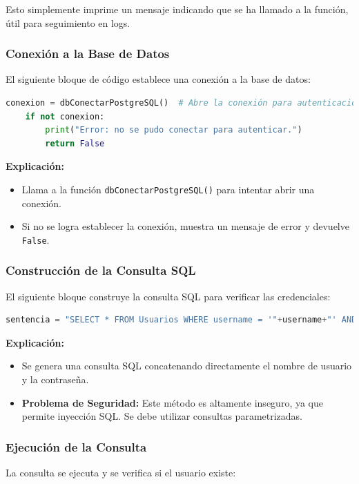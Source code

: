 \documentclass[a4paper,12pt]{article}
\begin{document}
Esto simplemente imprime un mensaje indicando que se ha llamado a la función, útil para seguimiento en logs.

\subsubsection{Conexión a la Base de Datos}
El siguiente bloque de código establece una conexión a la base de datos:

\begin{lstlisting}[language=Python]
    conexion = dbConectarPostgreSQL()  # Abre la conexión para autenticación
    if not conexion:
        print("Error: no se pudo conectar para autenticar.")
        return False
\end{lstlisting}

\textbf{Explicación:}
\begin{itemize}
    \item Llama a la función \texttt{dbConectarPostgreSQL()} para intentar abrir una conexión.
    \item Si no se logra establecer la conexión, muestra un mensaje de error y devuelve \texttt{False}.
\end{itemize}

\subsubsection{Construcción de la Consulta SQL}
El siguiente bloque construye la consulta SQL para verificar las credenciales:

\begin{lstlisting}[language=Python]
    sentencia = "SELECT * FROM Usuarios WHERE username = '"+username+"' AND password = '"+password+"'"
\end{lstlisting}

\textbf{Explicación:}
\begin{itemize}
    \item Se genera una consulta SQL concatenando directamente el nombre de usuario y la contraseña.
    \item \textbf{Problema de Seguridad:} Este método es altamente inseguro, ya que permite inyección SQL. Se debe utilizar consultas parametrizadas.
\end{itemize}

\subsubsection{Ejecución de la Consulta}
La consulta se ejecuta y se verifica si el usuario existe:
\end{document}
